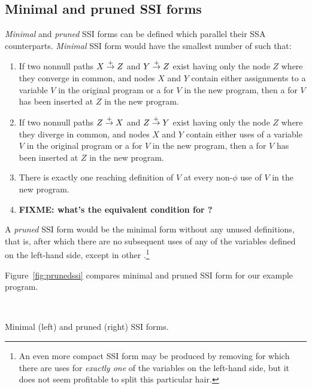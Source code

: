 \documentclass[12pt,titlepage,twoside]{article}
\begin{document}
\subsection{Minimal and pruned SSI forms}
\emph{Minimal} and \emph{pruned} SSI forms can be defined which
parallel their SSA counterparts.  \emph{Minimal} SSI form would have the
smallest number of  such that:
\begin{enumerate}
\item If two nonnull paths $X \stackrel{+}{\rightarrow} Z$ and $Y \stackrel{+}{\rightarrow} Z$
exist having only the node $Z$ where they converge in common,
and nodes $X$ and $Y$ contain either assignments to a variable $V$ in the
original program or a \phisigfunction[or] for $V$ in the new program,
then a \phifunction{} for $V$ has been inserted at $Z$ in the new program.
\item If two nonnull paths $Z \stackrel{+}{\rightarrow} X$ and $Z \stackrel{+}{\rightarrow} Y$
exist having only the node $Z$ where they diverge in common,
and nodes $X$ and $Y$ contain either uses of a variable $V$ in the
original program or a \phisigfunction[or] for $V$ in the new program,
then a \sigfunction{} for $V$ has been inserted at $Z$ in the new program.
\item There is exactly one reaching definition of $V$ at every
non-$\phi$ use of $V$ in the new program.
\item \textbf{FIXME: what's the equivalent condition for ?}
\end{enumerate}

A \emph{pruned} SSI form would be the minimal form without any unused
definitions, that is,  after which there are no
subsequent uses of any of the variables defined on the left-hand side,
except in other .\footnote{An even more
compact SSI form may be produced by removing  for which
there are uses for \emph{exactly one} of the variables on the
left-hand side, but it does not seem profitable to split this
particular hair.}

Figure~\vref{fig:prunedssi} compares minimal and pruned SSI form for
our example program.
\begin{myfigure}
\begin{center}
 \vline\ 
\end{center}
\caption[Minimal and pruned SSI forms.]
{Minimal (left) and pruned (right) SSI forms.}
\label{fig:prunedssi}
\end{myfigure}
\end{document}
